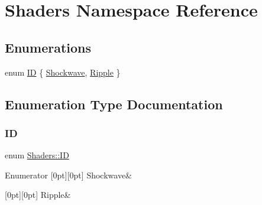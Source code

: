 \hypertarget{namespace_shaders}{}\section{Shaders Namespace Reference}
\label{namespace_shaders}
\subsection*{Enumerations}
\begin{DoxyCompactItemize}
\item 
enum \hyperlink{namespace_shaders_ac69c86b4e324fdda75990b34e9a1dc7e}{ID} \{ \hyperlink{namespace_shaders_ac69c86b4e324fdda75990b34e9a1dc7eaf02a64b9b6206367e82aae811cd52d1b}{Shockwave}, 
\hyperlink{namespace_shaders_ac69c86b4e324fdda75990b34e9a1dc7eaa670629dfa701b0829eec82754034c35}{Ripple}
 \}
\end{DoxyCompactItemize}


\subsection{Enumeration Type Documentation}
\mbox{\label{namespace_shaders_ac69c86b4e324fdda75990b34e9a1dc7e}} 
\subsubsection{\texorpdfstring{ID}{ID}}
{\footnotesize\ttfamily enum \hyperlink{namespace_shaders_ac69c86b4e324fdda75990b34e9a1dc7e}{Shaders\+::\+ID}}

\begin{DoxyEnumFields}{Enumerator}
[0pt][0pt]{}\mbox{\label{namespace_shaders_ac69c86b4e324fdda75990b34e9a1dc7eaf02a64b9b6206367e82aae811cd52d1b}} 
Shockwave&\\
\hline

[0pt][0pt]{}\mbox{\label{namespace_shaders_ac69c86b4e324fdda75990b34e9a1dc7eaa670629dfa701b0829eec82754034c35}} 
Ripple&\\
\hline

\end{DoxyEnumFields}
